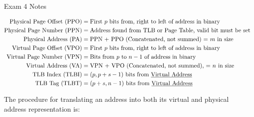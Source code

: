 \begin{examnotes}{Exam 4 Notes}
\begin{highlight}
        \begin{center}
            \begin{highlightenv}
                \begin{align*}
                    \text{Physical Page Offset (PPO)} & = \text{First $p$ bits from, right to left of address in binary} \\
                    \text{Physical Page Number (PPN)} & = \text{Address found from TLB or Page Table, valid bit must be set} \\
                    \text{Physical Address (PA)} & = \text{PPN + PPO (Concatenated, not summed) = $m$ in size} \\
                    \text{Virtual Page Offset (VPO)} & = \text{First $p$ bits from, right to left of address in binary} \\
                    \text{Virtual Page Number (VPN)} & = \text{Bits from $p$ to $n - 1$ of address in binary} \\
                    \text{Virtual Address (VA)} & = \text{VPN + VPO (Concatenated, not summed), = $n$ in size} \\
                    \text{TLB Index (TLBI)} & = \text{$(p, p + s - 1)$ bits from \underline{Virtual Address}} \\
                    \text{TLB Tag (TLBT)} & = \text{$(p + s, n - 1)$ bits from \underline{Virtual Address}}
                \end{align*}
            \end{highlightenv}
        \end{center}
        The procedure for translating an address into both its virtual and physical address representation is:


\end{highlight}
\end{examnotes}
